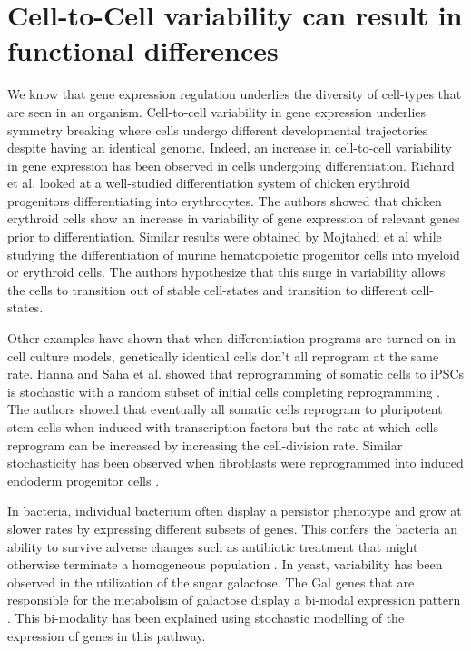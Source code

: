 \section{Cell-to-Cell variability can result in functional differences}

We know that gene expression regulation underlies the diversity of cell-types that are seen in an organism. Cell-to-cell variability in gene expression underlies symmetry breaking where cells undergo different developmental trajectories despite having an identical genome. Indeed, an increase in cell-to-cell variability in gene expression has been observed in cells undergoing differentiation. Richard et al.  \cite{richard_single-cell-based_2016} looked at a well-studied differentiation system of chicken erythroid progenitors differentiating into erythrocytes. The authors showed that chicken erythroid cells show an increase in variability of gene expression of relevant genes prior to differentiation. Similar results were obtained by Mojtahedi et al  \cite{mojtahedi_cell_2016} while studying the differentiation of murine hematopoietic progenitor cells into myeloid or erythroid cells. The authors hypothesize that this surge in variability allows the cells to transition out of stable cell-states and transition to different cell-states. 

Other examples have shown that when differentiation programs are turned on in cell culture models, genetically identical cells don't all reprogram at the same rate. Hanna and Saha et al. showed that reprogramming of somatic cells to iPSCs is stochastic with a random subset of initial cells completing reprogramming  \cite{hanna_direct_2009}. The authors showed that eventually all somatic cells reprogram to pluripotent stem cells when induced with transcription factors but the rate at which cells reprogram can be increased by increasing the cell-division rate. Similar stochasticity has been observed when fibroblasts were reprogrammed into induced endoderm progenitor cells \cite{biddy_single-cell_2018}.

In bacteria, individual bacterium often display a persistor phenotype and grow at slower rates by expressing different subsets of genes. This confers the bacteria an ability to survive adverse changes such as antibiotic treatment that might otherwise terminate a homogeneous population \cite{veening_bet-hedging_2008}. In yeast, variability has been observed in the utilization of the sugar galactose. The Gal genes that are responsible for the metabolism of galactose display a bi-modal expression pattern \cite{acar_enhancement_2005}. This bi-modality has been explained using stochastic modelling of the expression of genes in this pathway. 


